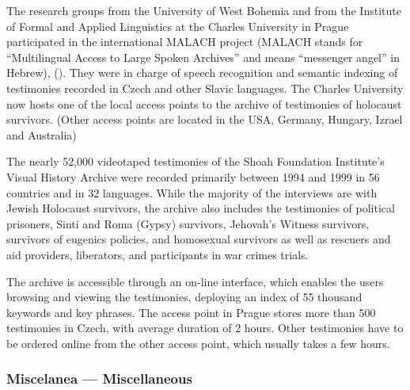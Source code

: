 \documentclass[]{../../metanetpaper}
\begin{document}
\begin{multicols}{2}
The research groups from the University of West Bohemia and from the Institute of Formal and Applied Linguistics at the Charles University in Prague participated in the international MALACH project (MALACH stands for “Multilingual Access to Large Spoken Archives” and means “messenger angel” in Hebrew), (\cite{Psutka2005}). They were in charge of speech recognition and semantic indexing of testimonies recorded in Czech and other Slavic languages. The Charles University now hosts one of the local access points to the archive of testimonies of holocaust survivors. (Other access points are located in the USA, Germany, Hungary, Izrael and Australia)

The nearly 52,000 videotaped testimonies of the Shoah Foundation Institute's Visual History Archive were recorded primarily between 1994 and 1999 in 56 countries and in 32 languages. While the majority of the interviews are with Jewish Holocaust survivors, the archive also includes the testimonies of political prisoners, Sinti and Roma (Gypsy) survivors, Jehovah's Witness survivors, survivors of eugenics policies, and homosexual survivors as well as rescuers and aid providers, liberators, and participants in war crimes trials.

The archive is accessible through an on-line interface, which enables the users browsing and viewing the testimonies, deploying an index of 55 thousand keywords and key phrases. The access point in Prague stores more than 500 testimonies in Czech, with average duration of 2 hours. Other testimonies have to be ordered online from the other access point, which usually takes a few hours.

\subsubsection{Miscelanea --- Miscellaneous}


\end{multicols}
\end{document}
